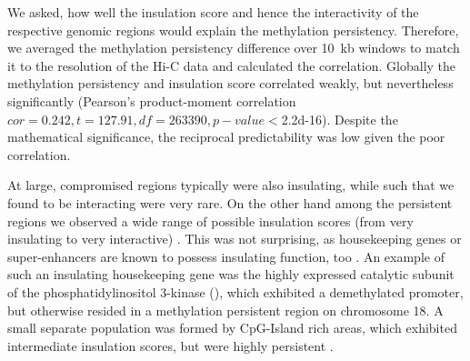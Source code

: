 We asked, how well the insulation score and hence the interactivity of the respective genomic regions would explain the methylation persistency. Therefore, we averaged the methylation persistency difference over \SI{10}{\kilo b} windows to match it to the resolution of the Hi-C data and calculated the correlation. Globally the methylation persistency and insulation score correlated weakly, but nevertheless significantly (Pearson's product-moment correlation $cor = 0.242, t = 127.91, df = 263390, p-value < $\num{2.2d-16}). Despite the mathematical significance, the reciprocal predictability was low given the poor correlation. 

At large, compromised regions typically were also insulating, while such that we found to be interacting were very rare. On the other hand among the persistent regions we observed a wide range of possible insulation scores (from very insulating to very interactive) . This was not surprising, as housekeeping genes or super-enhancers are known to possess insulating function, too . An example of such an insulating housekeeping gene was the highly expressed catalytic subunit of the phosphatidylinositol 3-kinase (), which exhibited a demethylated promoter, but otherwise resided in a methylation persistent region on chromosome 18. A small separate population was formed by CpG-Island rich areas, which exhibited intermediate insulation scores, but were highly persistent .